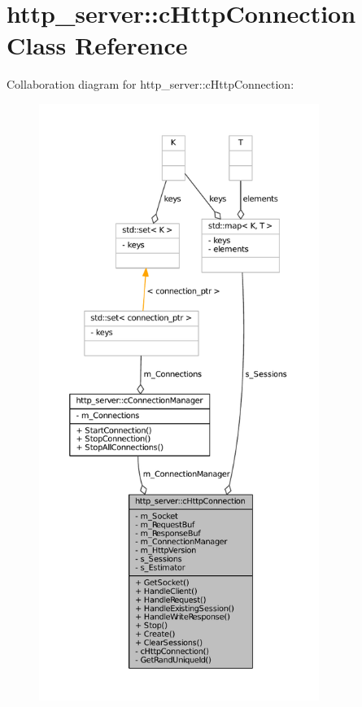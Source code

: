 \hypertarget{classhttp__server_1_1cHttpConnection}{
\section{http\-\_\-server\-:\-:c\-Http\-Connection \-Class \-Reference}
\label{classhttp__server_1_1cHttpConnection}
}


\-Collaboration diagram for http\-\_\-server\-:\-:c\-Http\-Connection\-:
\nopagebreak
\begin{figure}[H]
\begin{center}
\leavevmode
\includegraphics[height=550pt]{classhttp__server_1_1cHttpConnection__coll__graph}
\end{center}
\end{figure}

